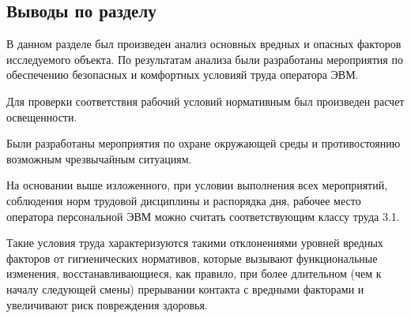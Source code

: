 \subsection{Выводы по разделу}
В данном разделе был произведен анализ основных вредных и опасных факторов исследуемого объекта.
По результатам анализа были разработаны мероприятия по обеспечению безопасных и комфортных условияй труда оператора ЭВМ.

Для проверки соответствия рабочий условий нормативным был произведен расчет освещенности.

Были разработаны мероприятия по охране окружающей среды и противостоянию возможным чрезвычайным ситуациям.

На основании выше изложенного, при условии выполнения всех мероприятий, соблюдения норм трудовой дисциплины и распорядка дня, рабочее место оператора персональной ЭВМ можно считать соответствующим классу труда 3.1.

Такие условия труда характеризуются такими отклонениями уровней вредных факторов от гигиенических нормативов, которые вызывают функциональные изменения, восстанавливающиеся, как правило, при более длительном (чем к началу следующей смены) прерывании контакта с вредными факторами и увеличивают риск повреждения здоровья.
